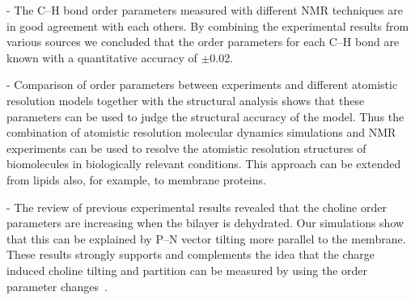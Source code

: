 \documentclass[journal=jacsat,manuscript=article]{achemso}
\begin{document}
- The C--H bond order parameters measured with different NMR techniques are in good agreement
with each others. By combining the experimental results from various sources we concluded
that the order parameters for each C--H bond are known with a quantitative accuracy of $\pm$0.02.

- Comparison of order parameters between experiments and different atomistic resolution models 
together with the structural analysis shows that these parameters can be used
to judge the structural accuracy of the model. Thus the combination of atomistic resolution 
molecular dynamics simulations and NMR experiments can be used to resolve the atomistic resolution
structures of biomolecules in biologically relevant conditions. 
This approach can be extended from lipids also, for example, to membrane proteins.


- The review of previous experimental results revealed that the 
choline order parameters are increasing when the bilayer is dehydrated. Our simulations show that
this can be explained by P--N vector tilting more parallel to the membrane. 
These results strongly supports and complements the idea that the charge induced choline tilting and 
partition can be measured by using the order parameter changes~\cite{ionpaper,scherer89}.

\end{document}
